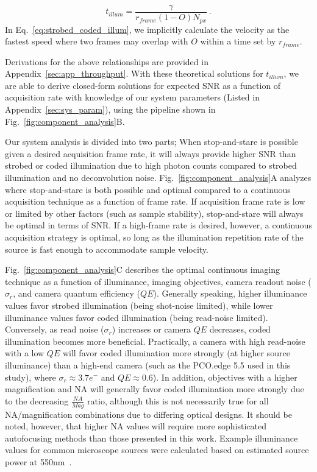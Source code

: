 \begin{equation}
\label{eq:strobed_coded_illum}
t_{illum} = \frac{\gamma}{r_{frame}(1 - O) N_{px}}\:.
\end{equation}
In Eq.~\ref{eq:strobed_coded_illum}, we implicitly calculate the velocity as the fastest speed where two frames may overlap with $O$ within a time set by $r_{frame}$.

Derivations for the above relationships are provided in Appendix~\ref{sec:app_throughput}. With these theoretical solutions for $t_{illum}$, we are able to derive closed-form solutions for expected SNR as a function of acquisition rate with knowledge of our system parameters (Listed in Appendix~\ref{sec:sys_param}), using the pipeline shown in Fig.~\ref{fig:component_analysis}B.

Our system analysis is divided into two parts; When stop-and-stare is possible given a desired acquisition frame rate, it will always provide higher SNR than strobed or coded illumination due to high photon counts compared to strobed illumination and no deconvolution noise. Fig.~\ref{fig:component_analysis}A analyzes where stop-and-stare is both possible and optimal compared to a continuous acquisition technique as a function of frame rate. If acquisition frame rate is low or limited by other factors (such as sample stability), stop-and-stare will always be optimal in terms of SNR. If a high-frame rate is desired, however, a continuous acquisition strategy is optimal, so long as the illumination repetition rate of the source is fast enough to accommodate sample velocity.

Fig.~\ref{fig:component_analysis}C describes the optimal continuous imaging technique as a function of illuminance, imaging objectives, camera readout noise ($\sigma_r$, and camera quantum efficiency ($QE$). Generally speaking, higher illuminance values favor strobed illumination (being shot-noise limited), while lower illuminance values favor coded illumination (being read-noise limited). Conversely, as read noise ($\sigma_r$) increases or camera $QE$ decreases, coded illumination becomes more beneficial. Practically, a camera with high read-noise with a low $QE$ will favor coded illumination more strongly (at higher source illuminance) than a high-end camera (such as the PCO.edge 5.5 used in this study), where $\sigma_r \approx 3.7 e^-$ and $QE \approx 0.6$). In addition, objectives with a higher magnification and NA will generally favor coded illumination more strongly due to the decreasing $\frac{NA}{Mag}$ ratio, although this is not necessarily true for all NA/magnification combinations due to differing optical designs. It should be noted, however, that higher NA values will require more sophisticated autofocusing methods than those presented in this work. Example illuminance values for common microscope sources were calculated based on estimated source power at 550nm~\cite{illumpower}.


